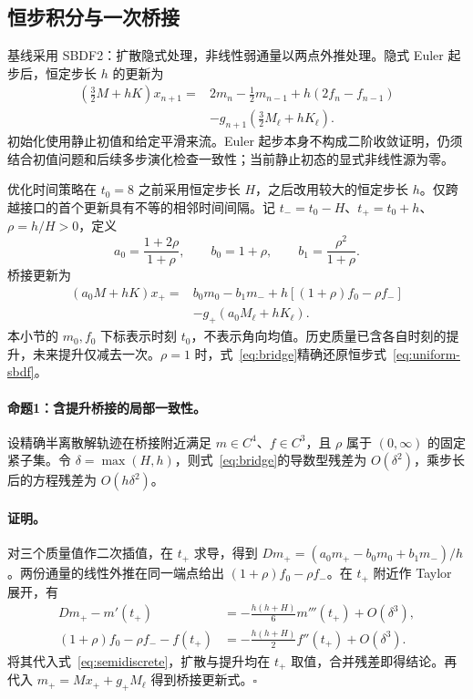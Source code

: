 \subsection{恒步积分与一次桥接}
\label{sec:time-phase}

基线采用 SBDF2：扩散隐式处理，非线性弱通量以两点外推处理\cite{r9,r12}。隐式 Euler 起步后，恒定步长 \(h\) 的更新为
\begin{equation}
 \begin{aligned}
 (\tfrac32M+hK)x_{n+1}
 ={}&2m_n-\tfrac12m_{n-1}+h(2f_n-f_{n-1})\\
 &-g_{n+1}(\tfrac32M_\ell+hK_\ell).
 \end{aligned}
 \label{eq:uniform-sbdf}
\end{equation}
初始化使用静止初值和给定平滑来流。Euler 起步本身不构成二阶收敛证明，仍须结合初值问题和后续多步演化检查一致性；当前静止初态的显式非线性源为零。

优化时间策略在 \(t_0=8\) 之前采用恒定步长 \(H\)，之后改用较大的恒定步长 \(h\)。仅跨越接口的首个更新具有不等的相邻时间间隔。记 \(t_-=t_0-H\)、\(t_+=t_0+h\)、\(\rho=h/H>0\)，定义
\begin{equation}
 a_0=\frac{1+2\rho}{1+\rho},\qquad
 b_0=1+\rho,\qquad b_1=\frac{\rho^2}{1+\rho}.
 \label{eq:bridge-coefficients}
\end{equation}
桥接更新为
\begin{equation}
 \begin{aligned}
 (a_0M+hK)x_+={}&b_0m_0-b_1m_-+
 h[(1+\rho)f_0-\rho f_-]\\
 &-g_+(a_0M_\ell+hK_\ell).
 \end{aligned}
 \label{eq:bridge}
\end{equation}
本小节的 \(m_0,f_0\) 下标表示时刻 \(t_0\)，不表示角向均值。历史质量已含各自时刻的提升，未来提升仅减去一次。\(\rho=1\) 时，式~\eqref{eq:bridge}精确还原恒步式~\eqref{eq:uniform-sbdf}。

\paragraph{命题1：含提升桥接的局部一致性。}
设精确半离散解轨迹在桥接附近满足 \(m\in C^4\)、\(f\in C^3\)，且 \(\rho\) 属于 \((0,\infty)\) 的固定紧子集。令 \(\delta=\max(H,h)\)，则式~\eqref{eq:bridge}的导数型残差为 \(O(\delta^2)\)，乘步长后的方程残差为 \(O(h\delta^2)\)。

\paragraph{证明。}
对三个质量值作二次插值，在 \(t_+\) 求导，得到 \(Dm_+=(a_0m_+-b_0m_0+b_1m_-)/h\)。两份通量的线性外推在同一端点给出 \((1+\rho)f_0-\rho f_-\)。在 \(t_+\) 附近作 Taylor 展开，有
\begin{align}
 Dm_+-m'(t_+)
 &=-\frac{h(h+H)}{6}m'''(t_+)+O(\delta^3),
 \label{eq:bridge-derivative}\\
 (1+\rho)f_0-\rho f_- - f(t_+)
 &=-\frac{h(h+H)}{2}f''(t_+)+O(\delta^3).
 \label{eq:bridge-extrapolation}
\end{align}
将其代入式~\eqref{eq:semidiscrete}，扩散与提升均在 \(t_+\) 取值，合并残差即得结论。再代入 \(m_+=Mx_++g_+M_\ell\) 得到桥接更新式。\hfill\(\square\)

